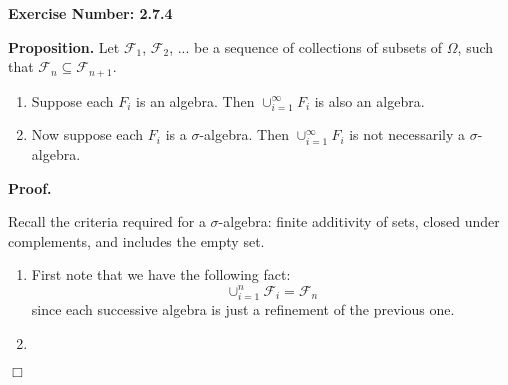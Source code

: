 \documentclass{article}
\begin{document}
\noindent \textbf{Exercise Number: 2.7.4}  %

\medskip 

\noindent \textbf{Proposition.} Let $\mathcal{F}_1$, $\mathcal{F}_2$, ... be a sequence of collections of subsets of $\Omega$, such that $\mathcal{F}_n \subseteq \mathcal{F}_{n+1}$. 

\begin{enumerate}

\item Suppose each $F_i$ is an algebra. Then $\cup_{i=1}^\infty F_i$ is also an algebra.  

\item Now suppose each $F_i$ is a $\sigma$-algebra. Then $\cup_{i=1}^\infty F_i$ is not necessarily a $\sigma$-algebra. 

\end{enumerate}

\bigskip

\noindent \textbf{Proof.} 

\medskip

\noindent Recall the criteria required for a $\sigma$-algebra: finite additivity of sets, 
closed under complements, and includes the empty set. 

\begin{enumerate}

\item First note that we have the following fact: \[\cup_{i = 1}^n \mathcal{F}_i = \mathcal{F}_n \] since each successive algebra is just a refinement of the previous one. 

\item 

\end{enumerate} 

\hfill $\Box$
\end{document}
